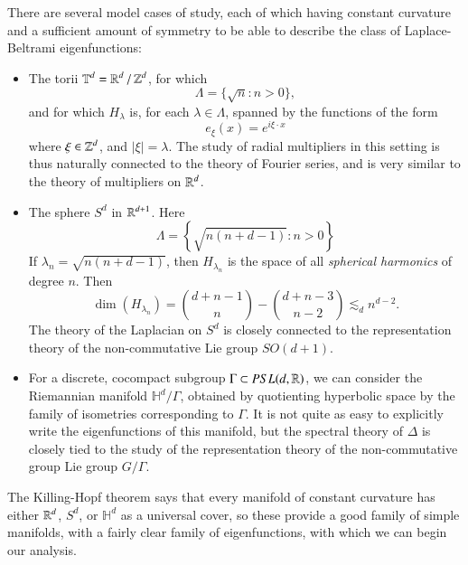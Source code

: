 There are several model cases of study, each of which having constant curvature and a sufficient amount of symmetry to be able to describe the class of Laplace-Beltrami eigenfunctions:
%
\begin{itemize}
    \item The torii $\operatorname{\mathbb{T}}^d = \operatorname{\mathbb{R}}^d / \operatorname{\mathbb{Z}}^d$, for which
    \[ \Lambda = \big\{ \sqrt{n}: n > 0 \big\}, \]
    and for which $H_\lambda$ is, for each $\lambda \in \Lambda$, spanned by the functions of the form
    \[ e_\xi(x) = e^{i \xi \cdot x} \]
    where $\xi \in \operatorname{\mathbb{Z}}^d$, and $|\xi| = \lambda$. The study of radial multipliers in this setting is thus naturally connected to the theory of Fourier series, and is very similar to the theory of multipliers on $\operatorname{\mathbb{R}}^d$.

    \item The sphere $S^d$ in $\operatorname{\mathbb{R}}^{d+1}$. Here
    \[ \Lambda = \left\{ \sqrt{n(n+d-1)}: n > 0 \right\} \]
    If $\lambda_n = \sqrt{n(n+d-1)}$, then $H_{\lambda_n}$ is the space of all \emph{spherical harmonics} of degree $n$. Then
    \[ \dim(H_{\lambda_n}) = \binom{d + n - 1}{n} - \binom{d + n - 3}{n - 2} \lesssim_d n^{d-2}. \]
    The theory of the Laplacian on $S^d$ is closely connected to the representation theory of the non-commutative Lie group $SO(d+1)$.

    \item For a discrete, cocompact subgroup $\Gamma \subset PSL(d,\operatorname{\mathbb{R}})$, we can consider the Riemannian manifold $\mathbb{H}^d / \Gamma$, obtained by quotienting hyperbolic space by the family of isometries corresponding to $\Gamma$. It is not quite as easy to explicitly write the eigenfunctions of this manifold, but the spectral theory of $\Delta$ is closely tied to the study of the representation theory of the non-commutative group Lie group $G / \Gamma$.
\end{itemize}
%
The Killing-Hopf theorem says that every manifold of constant curvature has either $\operatorname{\mathbb{R}}^d$, $S^d$, or $\mathbb{H}^d$ as a universal cover, so these provide a good family of simple manifolds, with a fairly clear family of eigenfunctions, with which we can begin our analysis.

